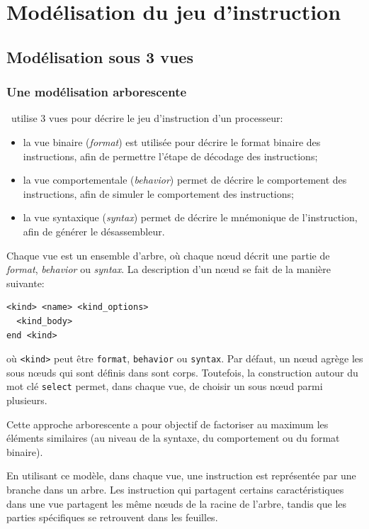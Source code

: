 \chapter{Modélisation du jeu d'instruction}
\section{Modélisation sous 3 vues}
\label{sec:modelisationArborescente}
\subsection{Une modélisation arborescente}
\harmless\ utilise 3 vues pour décrire le jeu d'instruction d'un processeur:
\begin{itemize}
\item la vue binaire (\emph{format}) est utilisée pour décrire le format binaire des instructions, afin de permettre l'étape de décodage des instructions;
\item la vue comportementale (\emph{behavior}) permet de décrire le comportement des instructions, afin de simuler le comportement des instructions;
\item la vue syntaxique (\emph{syntax}) permet de décrire le mnémonique de l'instruction, afin de générer le désassembleur.
\end{itemize}

Chaque vue est un ensemble d'arbre, où chaque n\oe ud décrit une partie de \emph{format}, \emph{behavior} ou \emph{syntax}. La description d'un n\oe ud se fait de la manière suivante:
\begin{verbatim}
<kind> <name> <kind_options>
  <kind_body>
end <kind>
\end{verbatim}
où \texttt{<kind>} peut être \texttt{format}, \texttt{behavior} ou \texttt{syntax}. Par défaut, un n\oe ud agrège les sous n\oe uds qui sont définis dans sont corps. Toutefois, la construction autour du mot clé \texttt{select} permet, dans chaque vue, de choisir un sous n\oe ud parmi plusieurs.

Cette approche arborescente a pour objectif de factoriser au maximum les éléments similaires (au niveau de la syntaxe, du comportement ou du format binaire).

En utilisant ce modèle, dans chaque vue, une instruction est représentée par une branche dans un arbre. Les instruction qui partagent certains caractéristiques dans une vue partagent les même n\oe uds de la racine de l'arbre, tandis que les parties spécifiques se retrouvent dans les feuilles.

